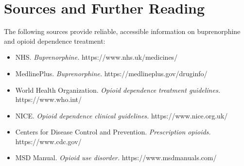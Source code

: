 \section*{Sources and Further Reading}
The following sources provide reliable, accessible information on buprenorphine and opioid dependence treatment:
\begin{itemize}
    \item NHS. \textit{Buprenorphine.} https://www.nhs.uk/medicines/
    \item MedlinePlus. \textit{Buprenorphine.} https://medlineplus.gov/druginfo/
    \item World Health Organization. \textit{Opioid dependence treatment guidelines.} https://www.who.int/
    \item NICE. \textit{Opioid dependence clinical guidelines.} https://www.nice.org.uk/
    \item Centers for Disease Control and Prevention. \textit{Prescription opioids.} https://www.cdc.gov/
    \item MSD Manual. \textit{Opioid use disorder.} https://www.msdmanuals.com/
\end{itemize}
